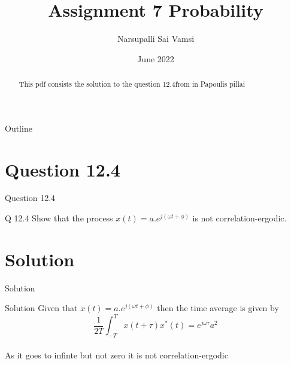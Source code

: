 \documentclass{beamer}
\title{Assignment 7 Probability}
\author{Narsupalli Sai Vamsi}
\date{June 2022}
\begin{document}
\begin{frame}
\titlepage
 \begin{abstract}
     This pdf consists the solution to the question 12.4from in Papoulis pillai
 \end{abstract}   
\end{frame}
\begin{frame}{Outline}
\tableofcontents
\end{frame}
\section{Question 12.4}
\begin{frame}{Question 12.4}
\begin{block}{Q 12.4}
Show that the process $x(t) = a.e^{j(\omega t + \phi)}$ is not correlation-ergodic.
\end{block}
\end{frame}
\section{Solution}
\begin{frame}{Solution}
\begin{block}{Solution}
Given that $x(t) = a.e^{j(\omega t + \phi)}$ then the time average is given by
$$\frac{1}{2T}\int_{-T}^{T} x(t+\tau)x^{*}(t) = e^{j\omega\tau} a^2$$\\
As it goes to infinte but not zero it is not correlation-ergodic
\end{block}
\end{frame}
\end{document}
